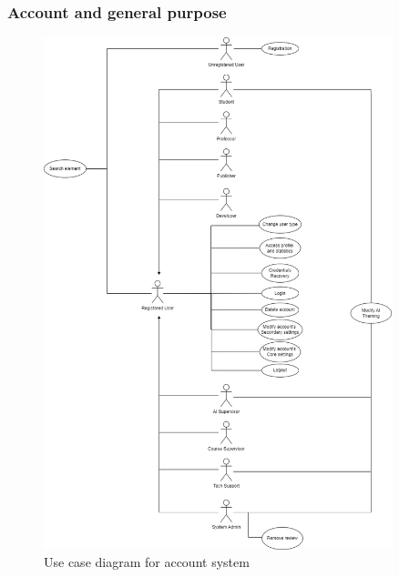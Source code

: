 \subsubsection{Account and general purpose}
\begin{figure}[H]
	\centering
	\includegraphics[width=0.9\textwidth]{images/UC-account.png}
	\caption{Use case diagram for account system}
	\label{fig:UC-account}
\end{figure}

\newpage
